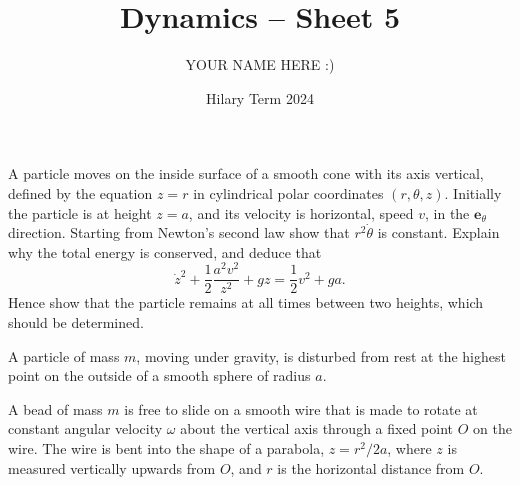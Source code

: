 \documentclass[answers]{exam}
\title{Dynamics -- Sheet 5}
\author{YOUR NAME HERE :)}
\date{Hilary Term 2024}
\begin{document}
\maketitle
\begin{questions}

\question%
A particle moves on the inside surface of a smooth cone with its axis vertical, defined by the equation $z=r$ in cylindrical polar coordinates $(r, \theta, z)$. Initially the particle is at height $z=a$, and its velocity is horizontal, speed $v$, in the $\mathbf{e}_{\theta}$ direction. Starting from Newton's second law show that $r^{2} \dot{\theta}$ is constant. Explain why the total energy is conserved, and deduce that \[
	\dot{z}^{2}+\frac{1}{2} \frac{a^{2} v^{2}}{z^{2}}+g z=\frac{1}{2} v^{2}+g a.
\] Hence show that the particle remains at all times between two heights, which should be determined.



\question%
A particle of mass $m$, moving under gravity, is disturbed from rest at the highest point on the outside of a smooth sphere of radius $a$.



\question%
A bead of mass $m$ is free to slide on a smooth wire that is made to rotate at constant angular velocity $\omega$ about the vertical axis through a fixed point $O$ on the wire. The wire is bent into the shape of a parabola, $z=r^{2} / 2 a$, where $z$ is measured vertically upwards from $O$, and $r$ is the horizontal distance from $O$.
\begin{parts}

\end{parts}
\end{questions}
\end{document}
